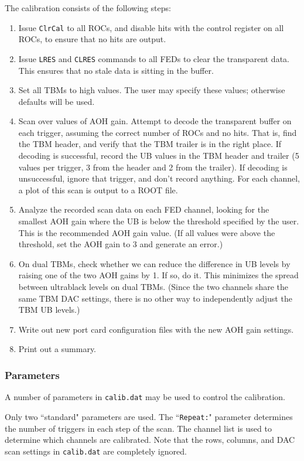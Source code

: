The calibration consists of the following steps:
\begin{enumerate}
\item Issue \verb|ClrCal| to all ROCs, and disable hits with the control register on all ROCs, to ensure that no hits are output.
\item Issue \verb|LRES| and \verb|CLRES| commands to all FEDs to clear the transparent data.  This ensures that no stale data is sitting in the buffer.
\item Set all TBMs to high values.  The user may specify these values; otherwise defaults will be used.
\item Scan over values of AOH gain.  Attempt to decode the transparent buffer on each trigger, assuming the correct number of ROCs and no hits. That is, find the TBM header, and verify that the TBM trailer is in the right place.  If decoding is successful, record the UB values in the TBM header and trailer (5 values per trigger, 3 from the header and 2 from the trailer).  If decoding is unsuccessful, ignore that trigger, and don't record anything.  For each channel, a plot of this scan is output to a ROOT file.
\item Analyze the recorded scan data on each FED channel, looking for the smallest AOH gain where the UB is below the threshold specified by the user.  This is the recommended AOH gain value.  (If all values were above the threshold, set the AOH gain to 3 and generate an error.)
\item On dual TBMs, check whether we can reduce the difference in UB levels by raising one of the two AOH gains by 1.  If so, do it.  This minimizes the spread between ultrablack levels on dual TBMs.  (Since the two channels share the same TBM DAC settings, there is no other way to independently adjust the TBM UB levels.)
\item Write out new port card configuration files with the new AOH gain settings.
\item Print out a summary.
\end{enumerate}

\subsubsection{Parameters}
A number of parameters in \verb|calib.dat| may be used to control the calibration.

Only two ``standard" parameters are used.  The ``\verb|Repeat:|" parameter determines the number of triggers in each step of the scan.  The channel list is used to determine which channels are calibrated.  Note that the rows, columns, and DAC scan settings in \verb|calib.dat| are completely ignored.


